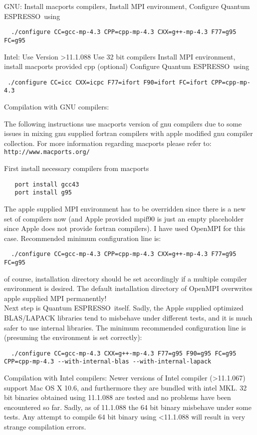 \documentclass[12pt,a4paper]{article}
\def\qe{{\sc Quantum ESPRESSO}}
\begin{document}
GNU:
Install macports compilers, 
Install MPI environment,
Configure \qe\  using
\begin{verbatim}
  ./configure CC=gcc-mp-4.3 CPP=cpp-mp-4.3 CXX=g++-mp-4.3 F77=g95 FC=g95
\end{verbatim}

Intel:
Use Version >11.1.088
Use 32 bit compilers
Install MPI environment,
install macports provided cpp (optional)
Configure \qe\ using
\begin{verbatim}
 ./configure CC=icc CXX=icpc F77=ifort F90=ifort FC=ifort CPP=cpp-mp-4.3
\end{verbatim}

Compilation with GNU compilers:

The following instructions use macports version of gnu compilers due to some
issues in mixing gnu supplied fortran compilers with apple modified gnu compiler
collection. For more information regarding macports please refer to:
\texttt{http://www.macports.org/}  

First install necessary compilers from macports
\begin{verbatim}
   port install gcc43
   port install g95
\end{verbatim}
The apple supplied MPI environment has to be overridden since there is
a new set of compilers now (and Apple provided mpif90 is just an empty 
placeholder since Apple does not provide fortran compilers). I have used
OpenMPI for this case. Recommended minimum configuration line is:
\begin{verbatim}
  ./configure CC=gcc-mp-4.3 CPP=cpp-mp-4.3 CXX=g++-mp-4.3 F77=g95 FC=g95
\end{verbatim}
of course, installation directory should be set accordingly if a multiple
compiler environment is desired. The default installation directory of 
OpenMPI overwrites apple supplied MPI permanently!\\
Next step is \qe\ itself. Sadly, the Apple supplied optimized BLAS/LAPACK
libraries tend to misbehave under different tests, and it is much safer to
use internal libraries. The minimum recommended configuration
line is (presuming the environment is set correctly):
\begin{verbatim}
  ./configure CC=gcc-mp-4.3 CXX=g++-mp-4.3 F77=g95 F90=g95 FC=g95 CPP=cpp-mp-4.3 --with-internal-blas --with-internal-lapack
\end{verbatim}

Compilation with Intel compilers:
Newer versions of Intel compiler (>11.1.067) support Mac OS X 10.6, and furthermore they are
bundled with intel MKL. 32 bit binaries obtained using 11.1.088 are tested and no problems
have been encountered so far. Sadly, as of 11.1.088 the 64 bit binary misbehave 
under some tests. Any attempt to compile 64 bit binary using <11.1.088 will result in
very strange compilation errors.   
\end{document}
